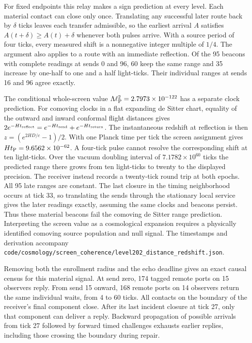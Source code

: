 \documentclass[11pt]{article}
\newcommand{\pathref}[1]{\nolinkurl{#1}}
\theoremstyle{remark}
\begin{document}
For fixed endpoints this relay makes a sign prediction at every level.
Each material contact can close only once. Translating any successful
later route back by $\delta$ ticks leaves each transfer admissible, so
the earliest arrival $A$ satisfies $A(t+\delta)\ge A(t)+\delta$ whenever
both pulses arrive. With a source period of four ticks, every measured
shift is a nonnegative integer multiple of $1/4$. The argument also
applies to a route with an immediate reflection. Of the 95 beacons with
complete readings at sends 0 and 96, 60 keep the same range and 35
increase by one-half to one and a half light-ticks. Their individual
ranges at sends 16 and 96 agree exactly.

The conditional whole-screen value $\Lambda\ell_{\rm P}^2=2.7973\times
10^{-122}$ has a separate clock prediction. For comoving clocks in a flat
expanding de Sitter chart, equality of the outward and inward conformal
flight distances gives $2e^{-Ht_{\rm reflect}}=e^{-Ht_{\rm send}}+
e^{-Ht_{\rm return}}$. The instantaneous redshift at reflection is then
$z=(e^{2HD/c}-1)/2$. With one Planck time per tick the screen assignment
gives $Ht_{\rm P}=9.6562\times10^{-62}$. A four-tick pulse cannot
resolve the corresponding shift at ten light-ticks. Over the vacuum
doubling interval of $7.1782\times10^{60}$ ticks the predicted range
there grows from ten light-ticks to twenty to the displayed precision.
The receiver instead records a twenty-tick round trip at both epochs.
All 95 late ranges are constant. The last closure in the timing
neighborhood occurs at tick 33, so translating the sends through the
stationary local service gives the later readings exactly, assuming the
same clocks and beacons persist. Thus these material beacons fail the
comoving de Sitter range prediction. Interpreting the screen value as a
cosmological expansion requires a physically identified comoving source
population and null signal. The timestamps and derivation accompany
\pathref{code/cosmology/screen_coherence/level202_distance_redshift.json}.

Removing both the enrollment radius and the echo deadline gives an exact
causal census for this material signal. At send zero, 174 tagged remote
ports on 15 observers reply. From send 15 onward, 168 remote ports on
14 observers return the same individual waits, from 4 to 60 ticks.
All contacts on the boundary of the receiver's final component close.
After its last incident closure at tick 27, only that component can
deliver a reply. Backward propagation of possible arrivals from tick 27
followed by forward timed challenges exhausts earlier replies, including
those crossing the boundary during repair.
\end{document}

